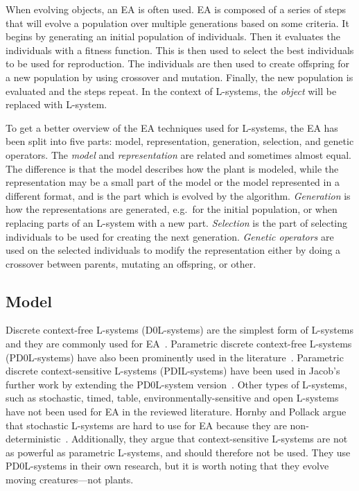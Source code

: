 When evolving objects, an \gls{EA} is often used.
\gls{EA} is composed of a series of steps that will evolve a population over multiple generations based on some criteria.
It begins by generating an initial population of individuals.
Then it evaluates the individuals with a fitness function.
This is then used to select the best individuals to be used for reproduction.
The individuals are then used to create offspring for a new population by using crossover and mutation.
Finally, the new population is evaluated and the steps repeat.
In the context of \glspl{L-system}, the \textit{object} will be replaced with \gls{L-system}.

To get a better overview of the \gls{EA} techniques used for \glspl{L-system}, the \gls{EA} has been split into five parts: model, representation, generation, selection, and genetic operators.
The \textit{model} and \textit{representation} are related and sometimes almost equal.
The difference is that the model describes how the plant is modeled, while the representation may be a small part of the model or the model represented in a different format, and is the part which is evolved by the algorithm.
\textit{Generation} is how the representations are generated, e.g.\ for the initial population, or when replacing parts of an \gls{L-system} with a new part.
\textit{Selection} is the part of selecting individuals to be used for creating the next generation.
\textit{Genetic operators} are used on the selected individuals to modify the representation either by doing a crossover between parents, mutating an offspring, or other.

\subsection{Model}
Discrete context-free \glspl{L-system} (D0L-systems) are the simplest form of \glspl{L-system} and they are commonly used for \gls{EA}~\cite{1998Mock,1998Ochoa,2002Ebner,2003Ebner,2006Ashlock,2009Beaumont,2009Corchado}.
Parametric discrete context-free \glspl{L-system} (PD0L-systems) have also been prominently used in the literature~\cite{1994Jacob,2000Vanak,2001Hornby}.
Parametric discrete context-sensitive \glspl{L-system} (PDIL-systems) have been used in Jacob's further work by extending the PD0L-system version~\cite{1995Jacob, 1996Jacob, 1996Jacob-2}.
Other types of \glspl{L-system}, such as stochastic, timed, table, environmentally-sensitive and open \glspl{L-system} have not been used for \gls{EA} in the reviewed literature.
Hornby and Pollack argue that stochastic \glspl{L-system} are hard to use for \gls{EA} because they are non-deterministic~\cite{2001Hornby}.
Additionally, they argue that context-sensitive \glspl{L-system} are not as powerful as parametric \glspl{L-system}, and should therefore not be used.
They use PD0L-systems in their own research, but it is worth noting that they evolve moving creatures---not plants.

